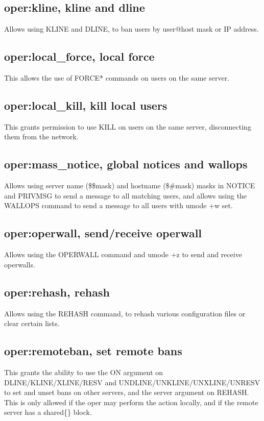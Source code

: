 \subsection{oper:kline, kline and dline}
	Allows using KLINE and DLINE, to ban users by user@host mask
	or IP address.

\subsection{oper:local\_force, local force}

This allows the use of FORCE* commands on users on the same server.

\subsection{oper:local\_kill, kill local users}
	This grants permission to use KILL on users on the same server,
	disconnecting them from the network.

\subsection{oper:mass\_notice, global notices and wallops}
	Allows using server name (\$\$mask) and hostname (\$\#mask) masks in
	NOTICE and PRIVMSG to send a message to all matching users, and allows
	using the WALLOPS command to send a message to all users with umode +w
	set.

\subsection{oper:operwall, send/receive operwall}
	Allows using the OPERWALL command and umode +z to send and receive
	operwalls.

\subsection{oper:rehash, rehash}
	Allows using the REHASH command, to rehash various configuration files
	or clear certain lists.

\subsection{oper:remoteban, set remote bans}
	This grants the ability to use the ON argument on
	DLINE/KLINE/XLINE/RESV and UNDLINE/UNKLINE/UNXLINE/UNRESV to set and
	unset bans on other servers, and the server argument on REHASH. This
	is only allowed if the oper may perform the action locally, and if the
	remote server has a shared\{\} block.

